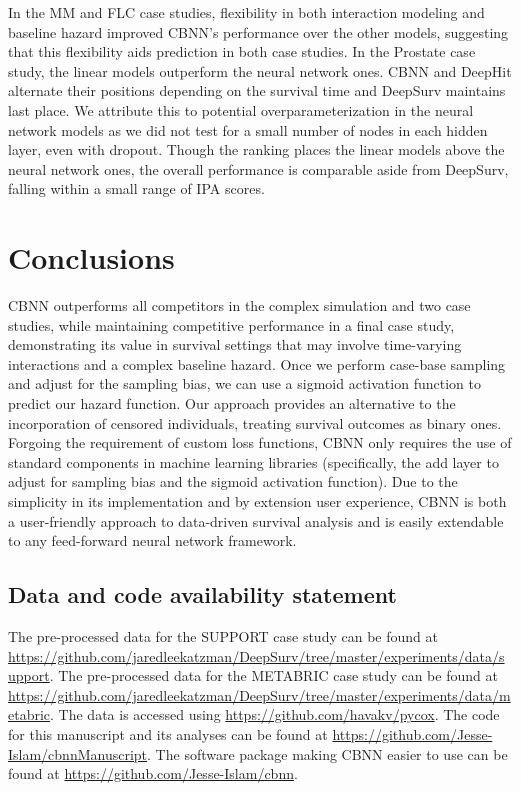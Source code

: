 \documentclass[APA,LATO1COL]{WileyNJD-v2}
\begin{document}
In the MM and FLC case studies, flexibility in both
interaction modeling and baseline hazard improved CBNN's performance over
the other models, suggesting that this flexibility aids prediction in
both case studies. In the Prostate case study, the linear models outperform
the neural network ones. CBNN and DeepHit alternate their positions depending
on the survival time and DeepSurv maintains last place.
We attribute this to potential overparameterization in the neural network models
as we did not test for a small number of nodes in each hidden layer, even with dropout.
Though the ranking places the linear models above the neural network ones, the overall
performance is comparable aside from DeepSurv, falling within a small range of IPA scores. 

\section{Conclusions}\label{sec5}

CBNN outperforms all competitors in the complex
simulation and two case studies, while maintaining competitive performance in a final case study,
demonstrating its value in survival settings that may
involve time-varying interactions and a complex baseline hazard. Once we
perform case-base sampling and adjust for the sampling bias, we can use
a sigmoid activation function to predict our hazard function. Our
approach provides an alternative to the incorporation of censored individuals, treating
survival outcomes as binary ones. Forgoing the requirement
of custom loss functions, CBNN only requires the use of standard
components in machine learning libraries (specifically, the add layer to
adjust for sampling bias and the sigmoid activation function). Due to
the simplicity in its implementation and by extension user experience,
CBNN is both a user-friendly approach to data-driven survival analysis
and is easily extendable to any feed-forward neural network framework.


\hypertarget{data-and-code-availability-statement}{%
\subsection*{Data and code availability
statement}\label{data-and-code-availability-statement}}

The pre-processed data for the SUPPORT case study can be found at
\url{https://github.com/jaredleekatzman/DeepSurv/tree/master/experiments/data/support}.
The pre-processed data for the METABRIC case study can be found at
\url{https://github.com/jaredleekatzman/DeepSurv/tree/master/experiments/data/metabric}.
The data is accessed using \url{https://github.com/havakv/pycox}. The
code for this manuscript and its analyses can be found at
\url{https://github.com/Jesse-Islam/cbnnManuscript}. The software
package making CBNN easier to use can be found at
\url{https://github.com/Jesse-Islam/cbnn}.
\end{document}
